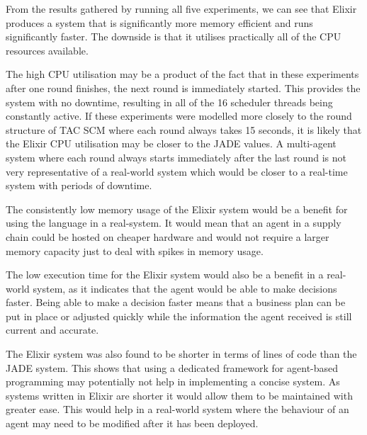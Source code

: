From the results gathered by running all five experiments, we can see that Elixir produces a system that is significantly more memory efficient and runs significantly faster.
The downside is that it utilises practically all of the CPU resources available.

The high CPU utilisation may be a product of the fact that in these experiments after one round finishes, the next round is immediately started.
This provides the system with no downtime, resulting in all of the 16 scheduler threads being constantly active.
If these experiments were modelled more closely to the round structure of TAC SCM where each round always takes 15 seconds, it is likely that the Elixir CPU utilisation may be closer to the JADE values.
A multi-agent system where each round always starts immediately after the last round is not very representative of a real-world system which would be closer to a real-time system with periods of downtime.

The consistently low memory usage of the Elixir system would be a benefit for using the language in a real-system.
It would mean that an agent in a supply chain could be hosted on cheaper hardware and would not require a larger memory capacity just to deal with spikes in memory usage.

The low execution time for the Elixir system would also be a benefit in a real-world system, as it indicates that the agent would be able to make decisions faster.
Being able to make a decision faster means that a business plan can be put in place or adjusted quickly while the information the agent received is still current and accurate.

The Elixir system was also found to be shorter in terms of lines of code than the JADE system.
This shows that using a dedicated framework for agent-based programming may potentially not help in implementing a concise system.
As systems written in Elixir are shorter it would allow them to be maintained with greater ease.
This would help in a real-world system where the behaviour of an agent may need to be modified after it has been deployed.
